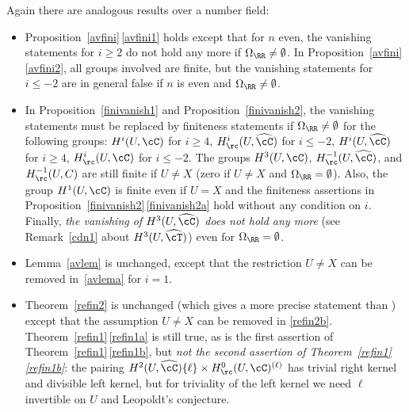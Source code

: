 \begin{rema} \label{cdn2}
Again there are analogous results over a number field:

\begin{itemize}

\item Proposition~\ref{avfini}\,\eqref{avfini1} holds except that for $n$ even,
the vanishing statements for $i \geq 2$ do not hold any more
if $\Omega_{\RR} \neq \emptyset$. In Proposition~\ref{avfini}\,\eqref{avfini2},
all groups involved are finite, but the vanishing statements
for $i \leq -2$ are in general false if $n$ is even and
$\Omega_{\RR} \neq \emptyset$.

\item In Proposition~\ref{finivanish1} and Proposition~\ref{finivanish2},
the vanishing statements must be repla\-ced by finiteness statements
if $\Omega_{\RR} \neq \emptyset$ for the following groups:
$H^i(U,\cC)$ for $i \geq 4$, $H^i_\rc(U,\widehat \cC)$ for $i \leq -2$,
$H^i(U,\widehat \cC)$ for $i \geq 4$, $H^i_\rc(U,\cC)$ for $i \leq -2$.
The groups $H^3(U,\cC)$, $H^{-1}_\rc(U,\widehat \cC)$, and
$H^{-1}_\rc(U,C)$ are still finite if $U \neq X$ (\resp zero if
$U \neq X$ and $\Omega_{\RR} = \emptyset$).
Also, the group $H^1(U,\cC)$ is finite even if $U=X$ and
the finiteness assertions in Proposition~\ref{finivanish2}\,\eqref{finivanish2a}
hold without any condition on $i$.
Finally,
\emph{the vanishing of $H^3(U,\widehat \cC)$ does not hold any more}
(see Remark~\ref{cdn1} about $H^3(U, \widehat \cT)$) even
for $\Omega_{\RR}=\emptyset$.

\item Lemma~\ref{avlem} is unchanged, except that the restriction
$U \neq X$ can be removed in~\eqref{avlema} for $i=1$.

\item Theorem~\ref{refin2} is unchanged (which gives a more precise statement
than \cite[Th.\,4.3]{demphd}) except that the assumption
$U \neq X$ can be removed in \eqref{refin2b}. Theorem~\ref{refin1}\,\eqref{refin1a} is still true,
as is the first assertion of Theorem~\ref{refin1}\,\eqref{refin1b}, but
\emph{not the second assertion of Theorem~\ref{refin1}\,\eqref{refin1b}}: the
pairing $H^2(U,\widehat \cC) \{\ell\} \times H^0_\rc(U,\cC)^{(\ell)}$
has trivial right kernel and divisible left kernel, but
for triviality of the left kernel we need $\ell$ invertible
on $U$ and Leopoldt's conjecture.


\end{itemize}
\end{rema}
